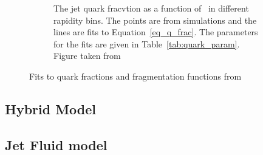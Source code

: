 \begin{figure}
\begin{subfigure}{.45\textwidth}
\caption{The jet quark fracvtion as a function of \ptjet\ in different rapidity bins. The points are from  simulations and the lines are fits to Equation~\ref{eq_q_frac}. The parameters for the fits are given in Table~\ref{tab:quark_param}. Figure taken from \cite{Spousta:2015fca}}
\label{fig:gluon_fragmentation}
\end{subfigure}
\caption{Fits to quark fractions and fragmentation functions from }
\label{fig:fig}
\end{figure}





\subsection{Hybrid Model}
\subsection{Jet Fluid model}












